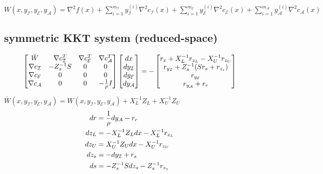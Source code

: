 \documentclass[10pt]{article}
\begin{document}
	$ W(x,y_{\mathcal I},y_{\mathcal E},y_{\mathcal A}) = \nabla^2 f(x) + \sum_{i = 1}^{m_{\mathcal I}} y_{\mathcal I}^{(i)} \nabla^2 c_{\mathcal I}(x) + \sum_{i = 1}^{m_{\mathcal E}} y_{\mathcal E}^{(i)} \nabla^2 c_{\mathcal E}(x) + \sum_{i = 1}^{m_{\mathcal A}} y_{\mathcal A}^{(i)} \nabla^2 c_{\mathcal A}(x)$
	
	\subsection*{symmetric KKT system (reduced-space)}
	\begin{equation}
	\begin{aligned}
		\begin{bmatrix}
		\bar{W} & \nabla c_{\mathcal I}^T & \nabla c_{\mathcal E}^T & \nabla c_{\mathcal A}^T \\
		\nabla c_{\mathcal I} & -Z_s^{-1}S & 0 & 0 \\
		\nabla c_{\mathcal E} & 0 & 0 & 0 \\
		\nabla c_{\mathcal A} & 0 & 0 &-\frac{1}{\rho}I \\
		\end{bmatrix}
		\begin{bmatrix}
		dx \\
		dy_{\mathcal I} \\
		dy_{\mathcal E} \\
		dy_{\mathcal A} \\
		\end{bmatrix}
		=
		-\begin{bmatrix}
		r_x + X_L^{-1}r_{z_L} - X_U^{-1} r_{z_U}\\
		r_{y_{\mathcal I}} + Z_s^{-1}(Sr_s + r_{z_s})\\
		r_{y_{\mathcal E}} \\
		r_{y_{\mathcal A}} + r_r\\
		\end{bmatrix}
	\end{aligned} \notag
	\end{equation}
	
	$\bar{W}(x,y_{\mathcal I},y_{\mathcal E},y_{\mathcal A}) = W(x,y_{\mathcal I},y_{\mathcal E},y_{\mathcal A}) + X_L^{-1}Z_L + X_U^{-1}Z_U $
	\\
	\begin{equation}
	\begin{aligned}
		dr &= \frac{1}{\rho} dy_{\mathcal A} - r_r\\
		dz_L &= -X_L^{-1}Z_L dx - X_L^{-1} r_{z_L}\\
		dz_U &= X_U^{-1}Z_U dx - X_U^{-1} r_{z_U}\\
		dz_s &= -dy_{\mathcal I} + r_s\\
		ds &= -Z_s^{-1}S dz_s - Z_s^{-1} r_{z_s}\\ \notag
	\end{aligned}
	\end{equation}
	
\end{document}
